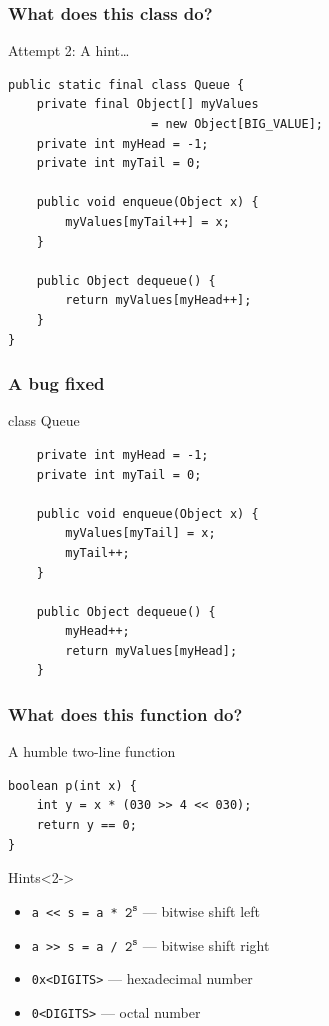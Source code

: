 \documentclass[screen]{beamer}
\begin{document}
\begin{frame}[c,fragile]
\frametitle{What does this class do?}%
%
\begin{block}{Attempt 2: A hint\ldots}
\begin{lstlisting}
public static final class Queue {
	private final Object[] myValues 
					= new Object[BIG_VALUE];
	private int myHead = -1;
	private int myTail = 0;
	
	public void enqueue(Object x) {
		myValues[myTail++] = x;
	}
	
	public Object dequeue() {
		return myValues[myHead++];
	}
}
\end{lstlisting}%
\end{block}
\end{frame}

\begin{frame}[c,fragile]
\frametitle{A bug fixed}%
%
\begin{block}{class Queue}
\begin{lstlisting}
	private int myHead = -1;
	private int myTail = 0;
	
	public void enqueue(Object x) {
		myValues[myTail] = x;
		myTail++;
	}
	
	public Object dequeue() {
		myHead++;
		return myValues[myHead];
	}
\end{lstlisting}%
\end{block}
\end{frame}

\begin{frame}[t,fragile]
\frametitle{What does this function do?}%
%
\begin{block}{A humble two-line function \smiley}
\begin{lstlisting}
boolean p(int x) {
	int y = x * (030 >> 4 << 030);
	return y == 0;
}
\end{lstlisting}%
\end{block}

\begin{block}{Hints}<2->
	\begin{itemize}
		\item \texttt{a << s = a * $\mathtt{2^s}$} --- bitwise shift left
		\item \texttt{a >> s = a / $\mathtt{2^s}$} --- bitwise shift right
		\item \texttt{0x<DIGITS>} --- hexadecimal number
		\item \texttt{0<DIGITS>} --- octal number
	\end{itemize}
\end{block}
\end{frame}
\end{document}
